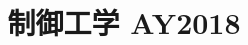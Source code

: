 \documentclass[11pt,a4paper]{article}
\title{制御工学 AY2018}
\author{}
\date{}
\begin{document}
\maketitle


\bigskip

\end{document}
